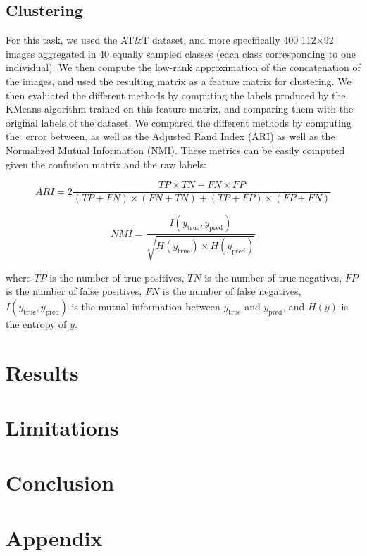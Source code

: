 \documentclass[sigconf]{acmart}
\begin{document}
\subsection{Clustering}

For this task, we used the AT\&T dataset, and more specifically 400 112$\times$92 images aggregated in 40 equally sampled classes (each class corresponding to one individual). We then compute the low-rank approximation of the concatenation of the images, and used the resulting matrix as a feature matrix for clustering. We then evaluated the different methods by computing the labels produced by the KMeans algorithm trained on this feature matrix, and comparing them with the original labels of the dataset. We compared the different methods by computing the $ $ error between, as well as the Adjusted Rand Index (ARI) as well as the Normalized Mutual Information (NMI). These metrics can be easily computed given the confusion matrix and the raw labels:

\[ ARI = 2 \frac{TP \times TN - FN \times FP}{(TP + FN)\times(FN + TN) + (TP + FP)\times(FP + FN)} \]

\[ NMI = \frac{I(y_{\text{true}}, y_{\text{pred}})}{\sqrt{H(y_{\text{true}}) \times H(y_{\text{pred}})}} \]

where $TP$ is the number of true positives, $TN$ is the number of true negatives, $FP$ is the number of false positives, $FN$ is the number of false negatives, $I(y_{\text{true}}, y_{\text{pred}})$ is the mutual information between $y_{\text{true}}$ and $y_{\text{pred}}$, and $H(y)$ is the entropy of $y$.

\section{Results}




\section{Limitations}




\section{Conclusion}




\section{Appendix}
\end{document}
